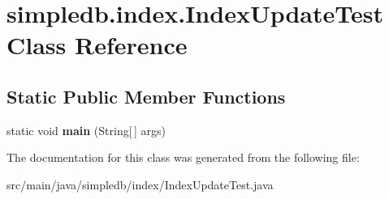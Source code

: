 \hypertarget{classsimpledb_1_1index_1_1IndexUpdateTest}{}\section{simpledb.\+index.\+Index\+Update\+Test Class Reference}
\label{classsimpledb_1_1index_1_1IndexUpdateTest}
\subsection*{Static Public Member Functions}
\begin{DoxyCompactItemize}
\item 
\mbox{\label{classsimpledb_1_1index_1_1IndexUpdateTest_a21b3e1d3f0dc1020b53bf5b74c9f1e0b}} 
static void {\bfseries main} (String\mbox{[}$\,$\mbox{]} args)
\end{DoxyCompactItemize}


The documentation for this class was generated from the following file\+:\begin{DoxyCompactItemize}
\item 
src/main/java/simpledb/index/Index\+Update\+Test.\+java\end{DoxyCompactItemize}
